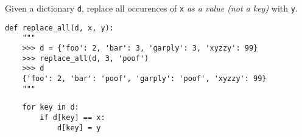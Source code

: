 \question Given a dictionary {\tt d}, replace all occurences of {\tt x} {\it as
a value (not a key)} with {\tt y}.
\begin{lstlisting}
def replace_all(d, x, y):
    """
    >>> d = {'foo': 2, 'bar': 3, 'garply': 3, 'xyzzy': 99}
    >>> replace_all(d, 3, 'poof')
    >>> d
    {'foo': 2, 'bar': 'poof', 'garply': 'poof', 'xyzzy': 99}
    """
\end{lstlisting}
\begin{solution}[1in]
\begin{lstlisting}
    for key in d:
        if d[key] == x:
            d[key] = y
\end{lstlisting}
\end{solution}

